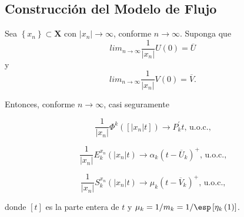 
\subsection{Construcci\'on del Modelo de Flujo}


\begin{Lema}\label{Lema4.2}
Sea $\left\{x_{n}\right\}\subset \mathbf{X}$ con
$|x_{n}|\rightarrow\infty$, conforme $n\rightarrow\infty$. Suponga
que
\[lim_{n\rightarrow\infty}\frac{1}{|x_{n}|}U\left(0\right)=\overline{U}\]
y
\[lim_{n\rightarrow\infty}\frac{1}{|x_{n}|}V\left(0\right)=\overline{V}.\]

Entonces, conforme $n\rightarrow\infty$, casi seguramente

\begin{equation}\label{E1.4.2}
\frac{1}{|x_{n}|}\Phi^{k}\left(\left[|x_{n}|t\right]\right)\rightarrow
P_{k}^{'}t\textrm{, u.o.c.,}
\end{equation}

\begin{equation}\label{E1.4.3}
\frac{1}{|x_{n}|}E^{x_{n}}_{k}\left(|x_{n}|t\right)\rightarrow
\alpha_{k}\left(t-\overline{U}_{k}\right)^{+}\textrm{, u.o.c.,}
\end{equation}

\begin{equation}\label{E1.4.4}
\frac{1}{|x_{n}|}S^{x_{n}}_{k}\left(|x_{n}|t\right)\rightarrow
\mu_{k}\left(t-\overline{V}_{k}\right)^{+}\textrm{, u.o.c.,}
\end{equation}

donde $\left[t\right]$ es la parte entera de $t$ y
$\mu_{k}=1/m_{k}=1/\esp\left[\eta_{k}\left(1\right)\right]$.
\end{Lema}

